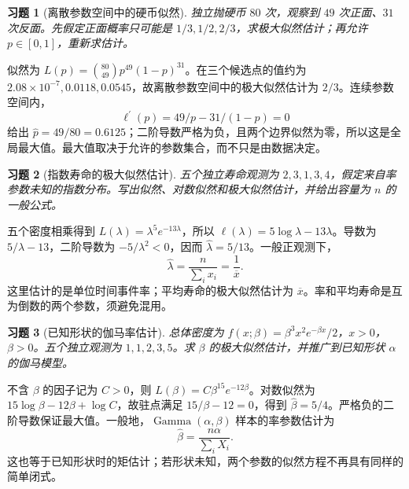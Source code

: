 \documentclass[12pt,fontset=fandol]{ctexart}
\newtheorem{exercise}{习题}[section]
\begin{document}
\begin{exercise}[离散参数空间中的硬币似然]\label{q:M-C10-1}
独立抛硬币 $80$ 次，观察到 $49$ 次正面、$31$ 次反面。先假定正面概率只可能是 $1/3,1/2,2/3$，求极大似然估计；再允许 $p\in[0,1]$，重新求估计。\par{}
\end{exercise}

\begin{solve}\label{a:M-C10-1}似然为 $L(p)=\binom{80}{49}p^{49}(1-p)^{31}$。在三个候选点的值约为 $2.08\times10^{-7},0.0118,0.0545$，故离散参数空间中的极大似然估计为 $2/3$。连续参数空间内，\[\ell^{\prime}(p)=49/p-31/(1-p)=0\]给出 $\widehat p=49/80=0.6125$；二阶导数严格为负，且两个边界似然为零，所以这是全局最大值。最大值取决于允许的参数集合，而不只是由数据决定。\end{solve}

\begin{exercise}[指数寿命的极大似然估计]\label{q:M-C10-2}
五个独立寿命观测为 $2,3,1,3,4$，假定来自率参数未知的指数分布。写出似然、对数似然和极大似然估计，并给出容量为 $n$ 的一般公式。\par{}
\end{exercise}

\begin{solve}\label{a:M-C10-2}五个密度相乘得到 $L(\lambda)=\lambda^5e^{-13\lambda}$，所以 $\ell(\lambda)=5\log\lambda-13\lambda$。导数为 $5/\lambda-13$，二阶导数为 $-5/\lambda^2<0$，因而 $\widehat\lambda=5/13$。一般正观测下，\[\widehat\lambda=\frac{n}{\sum_i x_i}=\frac1{\overline x}.\]这里估计的是单位时间事件率；平均寿命的极大似然估计为 $\overline x$。率和平均寿命是互为倒数的两个参数，须避免混用。\end{solve}

\begin{exercise}[已知形状的伽马率估计]\label{q:M-E2-II1}
总体密度为 $f(x;\beta)=\beta^3x^2e^{-\beta x}/2$，$x>0$，$\beta>0$。五个独立观测为 $1,1,2,3,5$。求 $\beta$ 的极大似然估计，并推广到已知形状 $\alpha$ 的伽马模型。\par{}
\end{exercise}

\begin{solve}\label{a:M-E2-II1}不含 $\beta$ 的因子记为 $C>0$，则 $L(\beta)=C\beta^{15}e^{-12\beta}$。对数似然为 $15\log\beta-12\beta+\log C$，故驻点满足 $15/\beta-12=0$，得到 $\widehat\beta=5/4$。严格负的二阶导数保证最大值。一般地，$\operatorname{Gamma}(\alpha,\beta)$ 样本的率参数估计为\[\widehat\beta=\frac{n\alpha}{\sum_iX_i}.\]这也等于已知形状时的矩估计；若形状未知，两个参数的似然方程不再具有同样的简单闭式。\end{solve}
\end{document}
